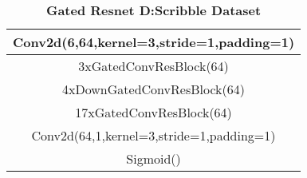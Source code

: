 \begin{table}[ht]
\caption{\textbf{Gated Resnet D:Scribble Dataset}} %
\centering %
\begin{tabular}{c} %
\hline
Conv2d(6,64,kernel=3,stride=1,padding=1) \\
\hline %
3xGatedConvResBlock(64) \\
4xDownGatedConvResBlock(64) \\
17xGatedConvResBlock(64) \\
\hline
Conv2d(64,1,kernel=3,stride=1,padding=1) \\
Sigmoid() \\
\hline
\end{tabular}
\label{table:resnet_d_scribble} %
\end{table}





